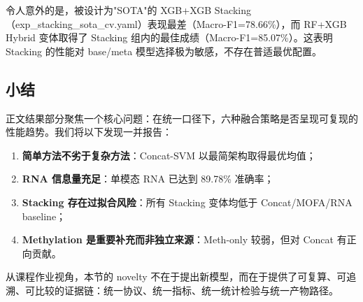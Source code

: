 令人意外的是，被设计为"SOTA"的 XGB+XGB Stacking（exp\_stacking\_sota\_cv.yaml）表现最差（Macro-F1=78.66\%），而 RF+XGB Hybrid 变体取得了 Stacking 组内的最佳成绩（Macro-F1=85.07\%）。这表明 Stacking 的性能对 base/meta 模型选择极为敏感，不存在普适最优配置。

\subsection{小结}

正文结果部分聚焦一个核心问题：在统一口径下，六种融合策略是否呈现可复现的性能趋势。我们将以下发现一并报告：

\begin{enumerate}
    \item \textbf{简单方法不劣于复杂方法}：Concat-SVM 以最简架构取得最优均值；
    \item \textbf{RNA 信息量充足}：单模态 RNA 已达到 89.78\% 准确率；
    \item \textbf{Stacking 存在过拟合风险}：所有 Stacking 变体均低于 Concat/MOFA/RNA baseline；
    \item \textbf{Methylation 是重要补充而非独立来源}：Meth-only 较弱，但对 Concat 有正向贡献。
\end{enumerate}

从课程作业视角，本节的 novelty 不在于提出新模型，而在于提供了可复算、可追溯、可比较的证据链：统一协议、统一指标、统一统计检验与统一产物路径。
